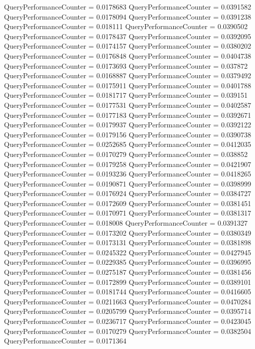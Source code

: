 \documentclass[9pt]{article}
\theoremstyle{plain}
\theoremstyle{definition}
\theoremstyle{remark}
\numberwithin{equation}{section}
\begin{document}
QueryPerformanceCounter  =  0.0178683
QueryPerformanceCounter  =  0.0391582
QueryPerformanceCounter  =  0.0178094
QueryPerformanceCounter  =  0.0391238
QueryPerformanceCounter  =  0.018111
QueryPerformanceCounter  =  0.0390502
QueryPerformanceCounter  =  0.0178437
QueryPerformanceCounter  =  0.0392095
QueryPerformanceCounter  =  0.0174157
QueryPerformanceCounter  =  0.0380202
QueryPerformanceCounter  =  0.0176848
QueryPerformanceCounter  =  0.0404738
QueryPerformanceCounter  =  0.0173693
QueryPerformanceCounter  =  0.037872
QueryPerformanceCounter  =  0.0168887
QueryPerformanceCounter  =  0.0379492
QueryPerformanceCounter  =  0.0175911
QueryPerformanceCounter  =  0.0401788
QueryPerformanceCounter  =  0.0181717
QueryPerformanceCounter  =  0.039151
QueryPerformanceCounter  =  0.0177531
QueryPerformanceCounter  =  0.0402587
QueryPerformanceCounter  =  0.0177183
QueryPerformanceCounter  =  0.0392671
QueryPerformanceCounter  =  0.0179937
QueryPerformanceCounter  =  0.0392122
QueryPerformanceCounter  =  0.0179156
QueryPerformanceCounter  =  0.0390738
QueryPerformanceCounter  =  0.0252685
QueryPerformanceCounter  =  0.0412035
QueryPerformanceCounter  =  0.0170279
QueryPerformanceCounter  =  0.038852
QueryPerformanceCounter  =  0.0179258
QueryPerformanceCounter  =  0.0421907
QueryPerformanceCounter  =  0.0193236
QueryPerformanceCounter  =  0.0418265
QueryPerformanceCounter  =  0.0190871
QueryPerformanceCounter  =  0.0398999
QueryPerformanceCounter  =  0.0176924
QueryPerformanceCounter  =  0.0384727
QueryPerformanceCounter  =  0.0172609
QueryPerformanceCounter  =  0.0381451
QueryPerformanceCounter  =  0.0170971
QueryPerformanceCounter  =  0.0381317
QueryPerformanceCounter  =  0.018008
QueryPerformanceCounter  =  0.0391327
QueryPerformanceCounter  =  0.0173202
QueryPerformanceCounter  =  0.0380349
QueryPerformanceCounter  =  0.0173131
QueryPerformanceCounter  =  0.0381898
QueryPerformanceCounter  =  0.0245322
QueryPerformanceCounter  =  0.0427945
QueryPerformanceCounter  =  0.0229385
QueryPerformanceCounter  =  0.0396995
QueryPerformanceCounter  =  0.0275187
QueryPerformanceCounter  =  0.0381456
QueryPerformanceCounter  =  0.0172899
QueryPerformanceCounter  =  0.0389101
QueryPerformanceCounter  =  0.0181744
QueryPerformanceCounter  =  0.0416605
QueryPerformanceCounter  =  0.0211663
QueryPerformanceCounter  =  0.0470284
QueryPerformanceCounter  =  0.0205799
QueryPerformanceCounter  =  0.0395714
QueryPerformanceCounter  =  0.0236717
QueryPerformanceCounter  =  0.0423045
QueryPerformanceCounter  =  0.0170279
QueryPerformanceCounter  =  0.0382504
QueryPerformanceCounter  =  0.0171364
\end{document}
